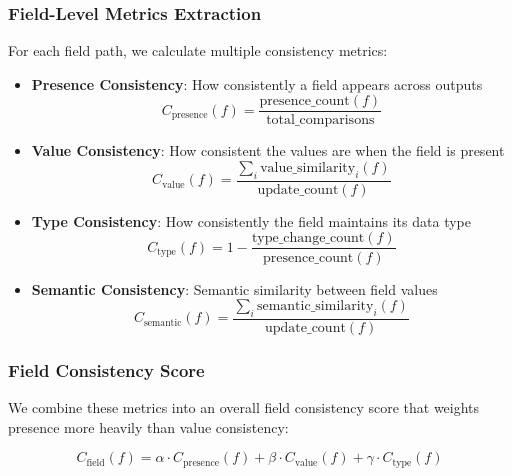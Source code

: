 \documentclass[letterpaper]{article} %
\begin{document}
\subsubsection{Field-Level Metrics Extraction}

For each field path, we calculate multiple consistency metrics:

\begin{itemize}
\item \textbf{Presence Consistency}: How consistently a field appears across outputs
\begin{equation}
C_{\text{presence}}(f) = \frac{\text{presence\_count}(f)}{\text{total\_comparisons}}
\end{equation}

\item \textbf{Value Consistency}: How consistent the values are when the field is present
\begin{equation}
C_{\text{value}}(f) = \frac{\sum_{i} \text{value\_similarity}_i(f)}{\text{update\_count}(f)}
\end{equation}

\item \textbf{Type Consistency}: How consistently the field maintains its data type
\begin{equation}
C_{\text{type}}(f) = 1 - \frac{\text{type\_change\_count}(f)}{\text{presence\_count}(f)}
\end{equation}

\item \textbf{Semantic Consistency}: Semantic similarity between field values
\begin{equation}
C_{\text{semantic}}(f) = \frac{\sum_{i} \text{semantic\_similarity}_i(f)}{\text{update\_count}(f)}
\end{equation}
\end{itemize}

\subsubsection{Field Consistency Score}

We combine these metrics into an overall field consistency score that weights presence more heavily than value consistency:

\begin{equation}
C_{\text{field}}(f) = \alpha \cdot C_{\text{presence}}(f) + \beta \cdot C_{\text{value}}(f) + \gamma \cdot C_{\text{type}}(f)
\end{equation}
\end{document}
